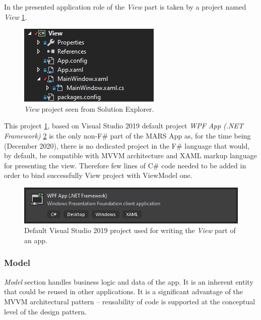         In the presented application role of the \textit{View} part is taken by a project named \textit{View} \ref{fig:view}.
        
        \begin{figure}[H]
            \centering
            \includegraphics{img/view.png}
            \caption{\textit{View} project seen from Solution Explorer.}
            \label{fig:view}
        \end{figure}
        
        This project \ref{fig:view}, based on Visual Studio 2019 default project \textit{WPF App (.NET Framework)} \ref{fig:view_wpfApp} is the only non-F\# part of the MARS App as, for the time being (December 2020), there is no dedicated project in the F\# language that would, by default, be compatible with MVVM architecture and XAML markup language for presenting the view. Therefore few lines of C\# code needed to be added in order to bind successfully View project with ViewModel one.
        
        \begin{figure}
            \centering
            \includegraphics{img/view_wpfApp.png}
            \caption{Default Visual Studio 2019 project used for writing the \textit{View} part of an app.}
            \label{fig:view_wpfApp}
        \end{figure}

    \subsubsection{Model}
        \textit{Model} section handles business logic and data of the app. It is an inherent entity that could be reused in other applications. It is a significant advantage of the MVVM architectural pattern -- reusability of code is supported at the conceptual level of the design pattern.
        
